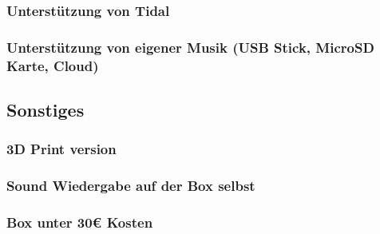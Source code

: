 \documentclass[10pt, a4paper, draft]{article}
\begin{document}
\subsubsection{Unterstützung von Tidal}
\subsubsection{Unterstützung von eigener Musik (USB Stick, MicroSD Karte, Cloud)}

\subsection{Sonstiges}
\subsubsection{3D Print version}
\subsubsection{Sound Wiedergabe auf der Box selbst}
\subsubsection{Box unter 30€ Kosten}

 
\end{document}
